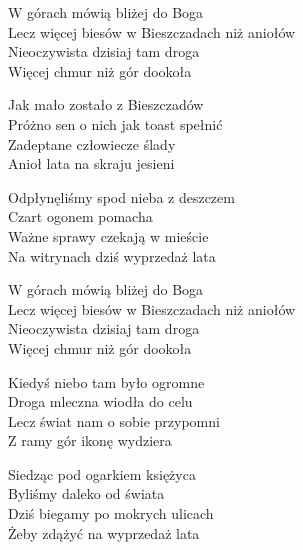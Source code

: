 \begin{text}
W górach mówią bliżej do Boga\\
Lecz więcej biesów w Bieszczadach niż aniołów\\
Nieoczywista dzisiaj tam droga\\
Więcej chmur niż gór dookoła

Jak mało zostało z Bieszczadów\\
Próżno sen o nich jak toast spełnić\\
Zadeptane człowiecze ślady\\
Anioł lata na skraju jesieni

Odpłynęliśmy spod nieba z deszczem\\
Czart ogonem pomacha\\
Ważne sprawy czekają w mieście\\
Na witrynach dziś wyprzedaż lata

W górach mówią bliżej do Boga\\
Lecz więcej biesów w Bieszczadach niż aniołów\\
Nieoczywista dzisiaj tam droga\\
Więcej chmur niż gór dookoła

Kiedyś niebo tam było ogromne\\
Droga mleczna wiodła do celu\\
Lecz świat nam o sobie przypomni\\
Z ramy gór ikonę wydziera

Siedząc pod ogarkiem księżyca\\
Byliśmy daleko od świata\\
Dziś biegamy po mokrych ulicach\\
Żeby zdążyć na wyprzedaż lata
\end{text}
\begin{chord}
\end{chord}